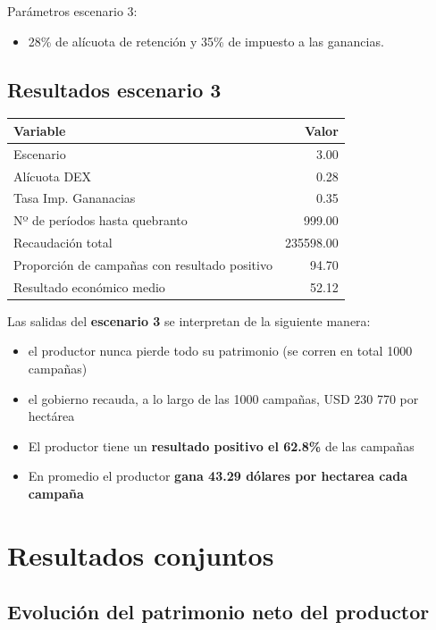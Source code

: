 \documentclass[
  12pt,
  spanish,
  10pt]{article}
\providecommand{\tightlist}{%
  \setlength{\itemsep}{0pt}\setlength{\parskip}{0pt}}
\begin{document}
Parámetros escenario 3:

\begin{itemize}
\tightlist
\item
  28\% de alícuota de retención y 35\% de impuesto a las ganancias.
\end{itemize}

\hypertarget{resultados-escenario-3}{%
\subsection{Resultados escenario 3}\label{resultados-escenario-3}}

\begin{longtable}[]{@{}lr@{}}
\toprule
Variable & Valor\tabularnewline
\midrule
\endhead
Escenario & 3.00\tabularnewline
Alícuota DEX & 0.28\tabularnewline
Tasa Imp. Gananacias & 0.35\tabularnewline
Nº de períodos hasta quebranto & 999.00\tabularnewline
Recaudación total & 235598.00\tabularnewline
Proporción de campañas con resultado positivo & 94.70\tabularnewline
Resultado económico medio & 52.12\tabularnewline
\bottomrule
\end{longtable}

Las salidas del \textbf{escenario 3} se interpretan de la siguiente
manera:

\begin{itemize}
\tightlist
\item
  el productor nunca pierde todo su patrimonio (se corren en total 1000
  campañas)
\item
  el gobierno recauda, a lo largo de las 1000 campañas, USD 230 770 por
  hectárea
\item
  El productor tiene un \textbf{resultado positivo el 62.8\%} de las
  campañas
\item
  En promedio el productor \textbf{gana 43.29 dólares por hectarea cada
  campaña}
\end{itemize}

\hypertarget{resultados-conjuntos}{%
\section{Resultados conjuntos}\label{resultados-conjuntos}}

\hypertarget{evoluciuxf3n-del-patrimonio-neto-del-productor}{%
\subsection{Evolución del patrimonio neto del
productor}\label{evoluciuxf3n-del-patrimonio-neto-del-productor}}
\end{document}
